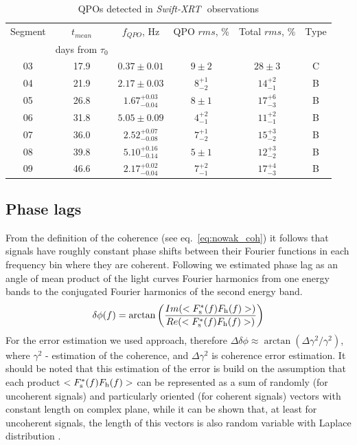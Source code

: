 \documentclass[a4paper,fleqn,usenatbib]{mnras}
\def\swiftx{{\em Swift-XRT\,}}
\begin{document}
\begin{table}
\noindent
\centering
\caption{QPOs detected in \swiftx\, observations}
\label{tab:xrtqpo}
\centering
\begin{tabular}{|c|c|c|c|c|c|}
\hline\hline
Segment &$t_{mean}$                   & $f_{QPO}$, Hz & QPO $rms$, \% & Total $rms$, \% & Type\\
                &   days from $\tau_{0}$     &                           &                           &                            &\\
\hline
03  &17.9&  $0.37\pm0.01$            & $9\pm2$       & $28\pm3$        & C\\
04  &21.9&  $2.17\pm0.03$            & $8_{-2}^{+1}$ & $14_{-1}^{+2}$  & B\\
05  &26.8&  $1.67_{-0.04}^{+0.03}$   & $8\pm1$       & $17_{-3}^{+6}$  & B\\ 
06  &31.8&  $5.05\pm0.09$            & $4_{-1}^{+2}$ & $11_{-1}^{+2}$  & B\\
07  &36.0&  $2.52_{-0.08}^{+0.07}$   & $7_{-2}^{+1}$ & $15_{-2}^{+3}$  & B\\ 
08  &39.8&  $5.10_{-0.14}^{+0.16}$   & $5\pm1$       & $12_{-2}^{+3}$  & B\\
09  &46.6&  $2.17_{-0.04}^{+0.02}$   & $7_{-1}^{+2}$ & $17_{-3}^{+4}$  & B\\
\hline
\end{tabular}
\end{table}

\subsection{Phase lags}
        From the definition of the coherence (see eq.~\ref{eq:nowak_coh}) it follows that signals have roughly constant phase shifts between their Fourier functions in each frequency bin where they are coherent. 
Following \citet{1997ApJ...474L..43V} we estimated phase lag as an angle of mean product of the light curves Fourier harmonics from one energy bands to the conjugated Fourier harmonics of the second energy band. 
\begin{equation}
      \delta \phi(f) = \arctan{\left(\frac{Im(<F_{\rm s}^{*}(f) F_{\rm h}(f)>)}{Re(<F_{\rm s}^{*}(f) F_{\rm h}(f)>)}\right)}
\end{equation}
For the error estimation we used \citet{2014A&ARv..22...72U} approach, therefore $\Delta\delta\phi \approx \arctan{(\Delta\gamma^2/\gamma^2)}$, where $\gamma^2$ - estimation of the coherence, and $\Delta\gamma^2$ is coherence error estimation.
It should be noted that this estimation of the error is build on the assumption that each product $<F_{\rm s}^{*}(f) F_{\rm h}(f)>$ can be represented as a sum of randomly (for uncoherent signals) and particularly oriented (for coherent signals) vectors with constant length on complex plane, while it can be shown that, at least for uncoherent signals, the length of this vectors is also random variable with Laplace distribution \citep{2017arXiv170909666H}.
\end{document}
